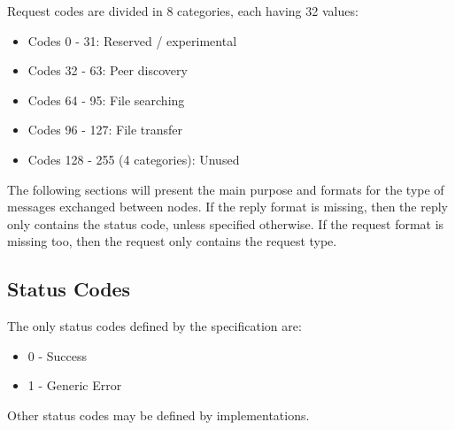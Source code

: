 \begin{figure}[H]
    \centering
\end{figure}

Request codes are divided in 8 categories, each having 32 values:
\begin{itemize}
    \item Codes 0 - 31: Reserved / experimental
    \item Codes 32 - 63: Peer discovery
    \item Codes 64 - 95: File searching
    \item Codes 96 - 127: File transfer
    \item Codes 128 - 255 (4 categories): Unused
\end{itemize}

The following sections will present the main purpose and formats for the type of
messages exchanged between nodes. If the reply format is missing, then the reply
only contains the status code, unless specified otherwise. If the request format
is missing too, then the request only contains the request type.

\subsection{Status Codes}

The only status codes defined by the specification are:
\begin{itemize}
    \item 0 - Success
    \item 1 - Generic Error
\end{itemize}

Other status codes may be defined by implementations.
